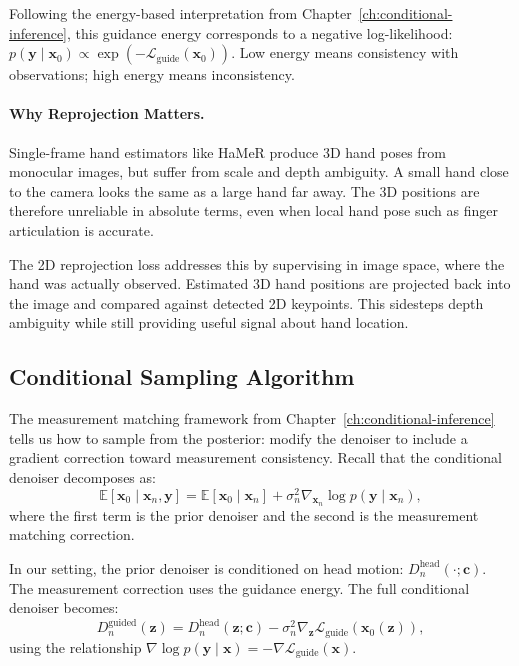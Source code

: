 Following the energy-based interpretation from
Chapter~\ref{ch:conditional-inference}, this guidance energy
corresponds to a negative log-likelihood: $p(\boldsymbol{y} \mid
\boldsymbol{x}_0) \propto \exp(-\mathcal{L}_{\text{guide}}(\boldsymbol{x}_0))$. Low
energy means consistency with observations; high energy means inconsistency.

\paragraph{Why Reprojection Matters.}
Single-frame hand estimators like HaMeR produce 3D hand poses from
monocular images, but suffer from scale and depth ambiguity. A small
hand close to the camera looks the same as a large hand far away. The
3D positions are therefore unreliable in absolute terms, even when
local hand pose such as finger articulation is accurate.

The 2D reprojection loss addresses this by supervising in image
space, where the hand was actually observed. Estimated 3D hand
positions are projected back into the image and compared against
detected 2D keypoints. This sidesteps depth ambiguity while still
providing useful signal about hand location.

\subsection{Conditional Sampling Algorithm}
\label{sub:egoallo_sampling}

The measurement matching framework from
Chapter~\ref{ch:conditional-inference} tells us how to sample from
the posterior: modify the denoiser to include a gradient correction
toward measurement consistency. Recall that the conditional denoiser
decomposes as:
\begin{equation}
    \mathbb{E}[\boldsymbol{x}_0 \mid \boldsymbol{x}_n, \boldsymbol{y}]
    =
    \mathbb{E}[\boldsymbol{x}_0 \mid \boldsymbol{x}_n]
    +
    \sigma_n^2 \nabla_{\boldsymbol{x}_n} \log p(\boldsymbol{y} \mid \boldsymbol{x}_n),
\end{equation}
where the first term is the prior denoiser and the second is the
measurement matching correction.

In our setting, the prior denoiser is conditioned on head motion:
$D_n^{\text{head}}(\cdot; \boldsymbol{c})$. The measurement correction uses
the guidance energy. The full conditional denoiser becomes:
\begin{equation}
    D_n^{\text{guided}}(\boldsymbol{z})
    =
    D_n^{\text{head}}(\boldsymbol{z};\boldsymbol{c})
    -
    \sigma_n^2
    \nabla_{\boldsymbol{z}}
    \mathcal{L}_{\text{guide}}(\boldsymbol{x}_0(\boldsymbol{z})),
\end{equation}
using the relationship $\nabla \log p(\boldsymbol{y} \mid \boldsymbol{x}) =
-\nabla \mathcal{L}_{\text{guide}}(\boldsymbol{x})$.

